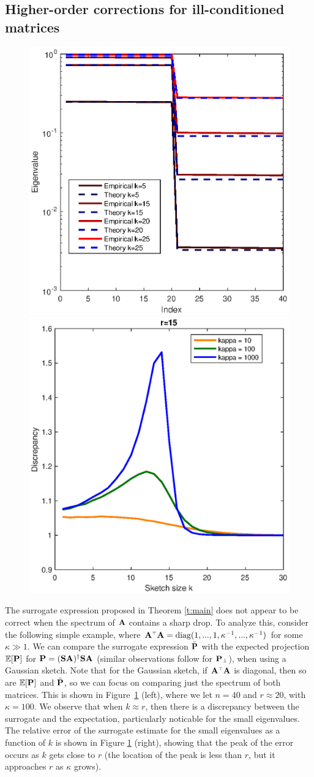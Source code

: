 \documentclass[11pt]{article}
\begin{document}
\subsection{Higher-order corrections for ill-conditioned matrices}

\begin{figure}[h]
  \centering
\includegraphics[width=.4\textwidth]{higher}\nobreak\includegraphics[width=.4\textwidth]{discrepancy}
\caption{}
\label{f:higher-svd}
\end{figure}


The surrogate expression proposed in Theorem \ref{t:main} does not appear
to be correct when the spectrum of $\A$ contains a sharp drop. To
analyze this, consider the following simple example, where $\A^\top\A
= \diag(1,...,1,\kappa^{-1},...,\kappa^{-1})$ for some $\kappa\gg
1$. We can compare the surrogate expression $\bar\P$ with the expected
projection $\E[\P]$ for $\P=(\S\A)^\dagger\S\A$ (similar
observations follow for $\P_{\perp}$), when using a Gaussian
sketch. Note that for the Gaussian sketch, if $\A^\top\A$ is diagonal,
then so are $\E[\P]$ and $\bar\P$, so we can focus on comparing just the
spectrum of both matrices. This is shown in Figure~\ref{f:higher-svd}
(left), where we let $n=40$ and $r\approx 20$, with $\kappa=100$. We
observe that when $k\approx r$, then there is a discrepancy between
the surrogate and the expectation, particularly noticable for the
small eigenvalues. The relative error of the surrogate estimate for
the small eigenvalues as a function of $k$ is shown in Figure
\ref{f:higher-svd} (right), showing that the peak of the error occurs
as $k$ gets close to $r$ (the location of the peak is less than $r$,
but it approaches $r$ as $\kappa$ grows).
\end{document}
